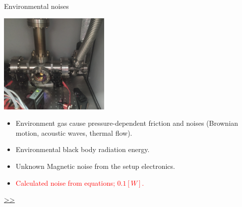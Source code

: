 \documentclass{beamer}
\begin{document}
\begin{frame}{\hypertarget{frame:Environmental noises}{Environmental noises}}
	\begin{center}		
		\includegraphics[width=0.4\textwidth,keepaspectratio]{actual system_crop.jpg}
    \end{center}
	\begin{itemize}
		
		\item Environment gas cause pressure-dependent friction and noises (Brownian motion, acoustic waves, thermal flow).  
		\item Environmental black body radiation energy.
		\item Unknown Magnetic noise from the setup electronics.
		\item \textcolor{red}{Calculated noise from equations; $0.1[W]$.}			

			
	\end{itemize}
	\hyperlink{frame:Environmental noises 1}{>>} 
\end{frame}
\end{document}
